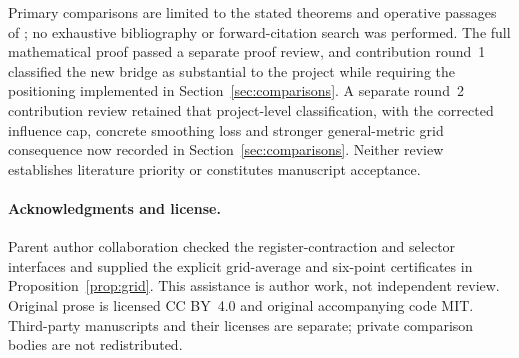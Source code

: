 \documentclass[11pt]{article}
\theoremstyle{remark}\newtheorem{remark}[theorem]{Remark}
\numberwithin{equation}{section}
\begin{document}
Primary comparisons are limited to the stated theorems and operative
passages of \cite{NPS,NY,KNT,LWW,CEE,JLW,MN,GMN,EGM}; no exhaustive
bibliography or forward-citation search was performed. The full
mathematical proof passed a separate proof review, and contribution
round~1 classified the new bridge as substantial to the project while
requiring the positioning implemented in Section~\ref{sec:comparisons}.
A separate round~2 contribution review retained that project-level
classification, with the corrected influence cap, concrete smoothing
loss and stronger general-metric grid consequence now recorded in
Section~\ref{sec:comparisons}. Neither review establishes literature
priority or constitutes manuscript acceptance.

\paragraph{Acknowledgments and license.}
Parent author collaboration checked the register-contraction and selector
interfaces and supplied the explicit grid-average and six-point
certificates in Proposition~\ref{prop:grid}. This assistance is author
work, not independent review. Original prose is licensed CC BY~4.0 and
original accompanying code MIT. Third-party manuscripts and their
licenses are separate; private comparison bodies are not redistributed.
\end{document}
